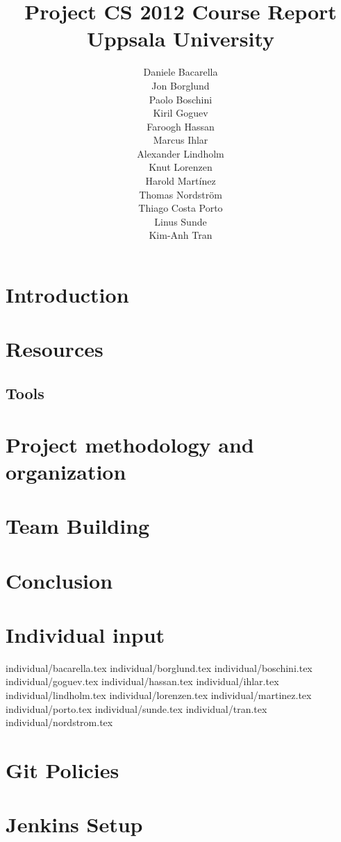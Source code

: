 \documentclass[11pt]{report}
\title{Project CS 2012 Course Report\\Uppsala University\\}
\author{Daniele Bacarella\\
		Jon Borglund\\
		Paolo Boschini\\
		Kiril Goguev\\
		Faroogh Hassan\\
		Marcus Ihlar\\
		Alexander Lindholm\\
		Knut Lorenzen\\
		Harold Mart\'{i}nez\\
		Thomas Nordstr\"om\\
		Thiago Costa Porto\\
		Linus Sunde\\
		Kim-Anh Tran
}
\date{}
\begin{document}
\maketitle

\tableofcontents

\begin{abstract}
 
\end{abstract}

\chapter{Introduction}

\chapter{Resources}





\section{Tools}
\label{sec:tools}




\chapter{Project methodology and organization}







\chapter{Team Building}

\chapter{Conclusion}


\appendix
\chapter{Individual input}

 {individual/bacarella.tex}
 {individual/borglund.tex}
 {individual/boschini.tex}
 {individual/goguev.tex}
 {individual/hassan.tex}
 {individual/ihlar.tex}
 {individual/lindholm.tex}
 {individual/lorenzen.tex}
 {individual/martinez.tex}
 {individual/porto.tex}
 {individual/sunde.tex}
 {individual/tran.tex}
 {individual/nordstrom.tex}

\chapter{Git Policies}

\chapter{Jenkins Setup}



\end{document}

